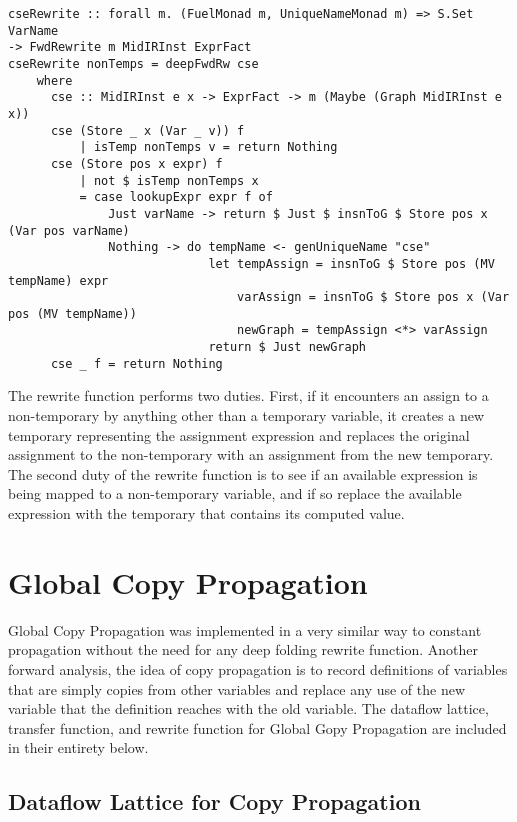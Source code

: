 \documentclass[11pt]{article}
\begin{document}
{\small\begin{verbatim}
cseRewrite :: forall m. (FuelMonad m, UniqueNameMonad m) => S.Set VarName 
-> FwdRewrite m MidIRInst ExprFact 
cseRewrite nonTemps = deepFwdRw cse 
    where 
      cse :: MidIRInst e x -> ExprFact -> m (Maybe (Graph MidIRInst e x))
      cse (Store _ x (Var _ v)) f
          | isTemp nonTemps v = return Nothing 
      cse (Store pos x expr) f 
          | not $ isTemp nonTemps x
          = case lookupExpr expr f of 
              Just varName -> return $ Just $ insnToG $ Store pos x (Var pos varName)
              Nothing -> do tempName <- genUniqueName "cse"
                            let tempAssign = insnToG $ Store pos (MV tempName) expr
                                varAssign = insnToG $ Store pos x (Var pos (MV tempName)) 
                                newGraph = tempAssign <*> varAssign 
                            return $ Just newGraph
      cse _ f = return Nothing
\end{verbatim}}

The rewrite function performs two duties. First, if it encounters an assign to a non-temporary by anything other than a temporary variable, it creates a new temporary representing the assignment expression and replaces the original assignment to the non-temporary with an assignment from the new temporary. The second duty of the rewrite function is to see if an available expression is being mapped to a non-temporary variable, and if so replace the available expression with the temporary that contains its computed value.

\section {Global Copy Propagation}
\label{sec:copyprop}

Global Copy Propagation was implemented in a very similar way to constant propagation without the need for any deep folding rewrite function. Another forward analysis, the idea of copy propagation is to record definitions of variables that are simply copies from other variables and replace any use of the new variable that the definition reaches with the old variable. The dataflow lattice, transfer function, and rewrite function for Global Gopy Propagation are included in their entirety below. 

\subsection { Dataflow Lattice for Copy Propagation }
\end{document}
